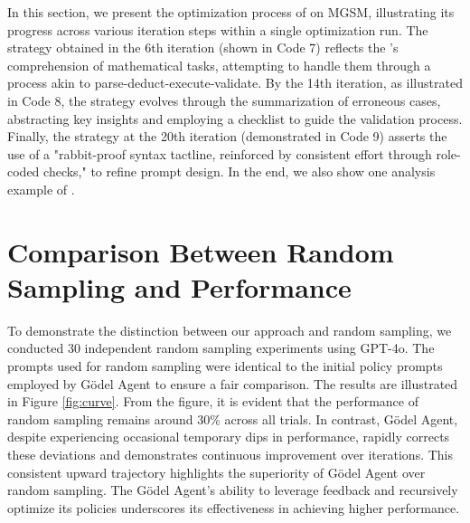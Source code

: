 \label{sec:spacialcode}
In this section, we present the optimization process of \framework on MGSM, illustrating its progress across various iteration steps within a single optimization run. The strategy obtained in the 6th iteration (shown in Code 7) reflects the \framework's comprehension of mathematical tasks, attempting to handle them through a process akin to parse-deduct-execute-validate. By the 14th iteration, as illustrated in Code 8, the strategy evolves through the summarization of erroneous cases, abstracting key insights and employing a checklist to guide the validation process. Finally, the strategy at the 20th iteration (demonstrated in Code 9) asserts the use of a "rabbit-proof syntax tactline, reinforced by consistent effort through role-coded checks," to refine prompt design. In the end, we also show one analysis example of \framework.



\section{Comparison Between Random Sampling and \framework Performance}
To demonstrate the distinction between our approach and random sampling, we conducted 30 independent random sampling experiments using GPT-4o. The prompts used for random sampling were identical to the initial policy prompts employed by Gödel Agent to ensure a fair comparison.
The results are illustrated in Figure \ref{fig:curve}. From the figure, it is evident that the performance of random sampling remains around 30\% across all trials. In contrast, Gödel Agent, despite experiencing occasional temporary dips in performance, rapidly corrects these deviations and demonstrates continuous improvement over iterations.
This consistent upward trajectory highlights the superiority of Gödel Agent over random sampling. The Gödel Agent’s ability to leverage feedback and recursively optimize its policies underscores its effectiveness in achieving higher performance.



